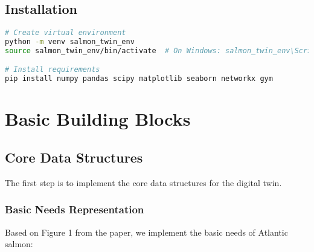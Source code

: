 \documentclass[11pt,a4paper]{article}
\begin{document}
\subsection{Installation}
\begin{lstlisting}[language=bash]
# Create virtual environment
python -m venv salmon_twin_env
source salmon_twin_env/bin/activate  # On Windows: salmon_twin_env\Scripts\activate

# Install requirements
pip install numpy pandas scipy matplotlib seaborn networkx gym
\end{lstlisting}

\section{Basic Building Blocks}
\subsection{Core Data Structures}
The first step is to implement the core data structures for the digital twin.

\subsubsection{Basic Needs Representation}
Based on Figure 1 from the paper, we implement the basic needs of Atlantic salmon:
\end{document}
